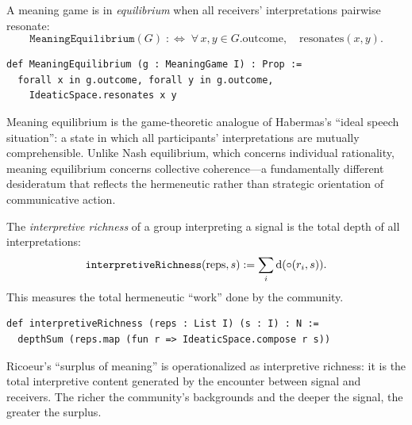 \begin{definition}
\label{def:MeaningEquilibrium}
A meaning game is in \emph{equilibrium} when all receivers' interpretations
pairwise resonate:
\[
  \texttt{MeaningEquilibrium}(G) \;:\Longleftrightarrow\;
  \forall\, x, y \in G.\text{outcome},\quad \text{resonates}(x, y).
\]
\end{definition}

\begin{lstlisting}[caption={Meaning equilibrium in Lean}]
def MeaningEquilibrium (g : MeaningGame I) : Prop :=
  forall x in g.outcome, forall y in g.outcome,
    IdeaticSpace.resonates x y
\end{lstlisting}

Meaning equilibrium is the game-theoretic analogue of Habermas's
``ideal speech situation'': a state in which all participants' interpretations
are mutually comprehensible.  Unlike Nash equilibrium, which concerns
individual rationality, meaning equilibrium concerns collective coherence---a
fundamentally different desideratum that reflects the hermeneutic rather than
strategic orientation of communicative action.

\begin{definition}
\label{def:interpretiveRichness}
The \emph{interpretive richness} of a group interpreting a signal is the
total depth of all interpretations:
\[
  \texttt{interpretiveRichness}(\text{reps}, s) :=
  \sum_{i} \operatorname{d}(\circ(r_i, s)).
\]
This measures the total hermeneutic ``work'' done by the community.
\end{definition}

\begin{lstlisting}[caption={Interpretive richness in Lean}]
def interpretiveRichness (reps : List I) (s : I) : N :=
  depthSum (reps.map (fun r => IdeaticSpace.compose r s))
\end{lstlisting}

Ricoeur's ``surplus of meaning'' is operationalized as interpretive richness:
it is the total interpretive content generated by the encounter between
signal and receivers.  The richer the community's backgrounds and the deeper
the signal, the greater the surplus.

